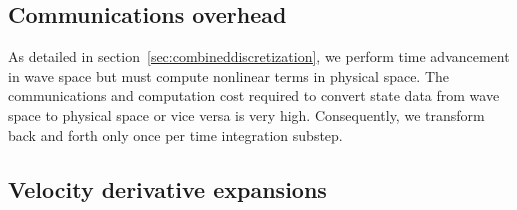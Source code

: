 \documentclass[letterpaper,11pt,nointlimits,reqno,draft]{amsart}
\begin{document}
\subsection{Communications overhead}
\label{sec:commoverhead}

As detailed in section~\ref{sec:combineddiscretization}, we perform time
advancement in wave space but must compute nonlinear terms in physical space.
The communications and computation cost required to convert state data from
wave space to physical space or vice versa is very high.  Consequently, we
transform back and forth only once per time integration substep.

\subsection{Velocity derivative expansions}
\label{velocity_derivative_expansions}
\end{document}
